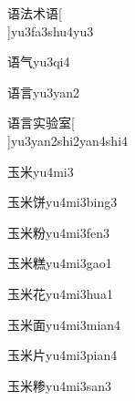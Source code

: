 \begin{verbete}[9;8;5;9]{语法术语}[\\]{yu3fa3shu4yu3}
\end{verbete}

\begin{verbete}[9;4]{语气}{yu3qi4}
\end{verbete}

\begin{verbete}[9;7]{语言}{yu3yan2}
\end{verbete}

\begin{verbete}[9;7;8;10;9]{语言实验室}[\\]{yu3yan2shi2yan4shi4}
\end{verbete}

\begin{verbete}[5;6]{玉米}{yu4mi3}
\end{verbete}

\begin{verbete}[5;6;9]{玉米饼}{yu4mi3bing3}
\end{verbete}

\begin{verbete}[5;6;10]{玉米粉}{yu4mi3fen3}
\end{verbete}

\begin{verbete}[5;6;16]{玉米糕}{yu4mi3gao1}
\end{verbete}

\begin{verbete}[5;6;7]{玉米花}{yu4mi3hua1}
\end{verbete}

\begin{verbete}[5;6;9]{玉米面}{yu4mi3mian4}
\end{verbete}

\begin{verbete}[5;6;4]{玉米片}{yu4mi3pian4}
\end{verbete}

\begin{verbete}[5;6;14]{玉米糁}{yu4mi3san3}
\end{verbete}

